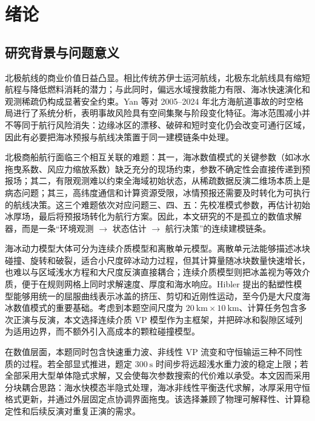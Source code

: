 \documentclass[UTF8,fontset=none]{ctexart}
\begin{document}
\pagestyle{plain}
\newpage
\linespread{1.25}\selectfont
\tableofcontents
\newpage

\section{绪论}

\subsection{研究背景与问题意义}

北极航线的商业价值日益凸显。相比传统苏伊士运河航线，北极东北航线具有缩短航程与降低燃料消耗的潜力；与此同时，偏远水域搜救能力有限、海冰快速演化和观测稀疏仍构成显著安全约束。Yan 等\cite{yan2026}对 2005--2024 年北方海航道事故的时空格局进行了系统分析，表明事故风险具有空间集聚与阶段变化特征。海冰范围减小并不等同于航行风险消失：边缘冰区的漂移、破碎和短时变化仍会改变可通行区域，因此有必要把海冰预报与航线决策置于同一建模链条中处理。

北极商船航行面临三个相互关联的难题：其一，海冰数值模式的关键参数（如冰水拖曳系数、风应力缩放系数）缺乏充分的现场约束，参数不确定性会直接传递到预报场；其二，有限观测难以约束全海域初始状态，从稀疏数据反演二维场本质上是病态问题；其三，高纬度通信和计算资源受限，冰情预报还需要及时转化为可执行的航线决策。这三个难题依次对应问题三、四、五：先校准模式参数，再估计初始冰厚场，最后将预报场转化为航行方案。因此，本文研究的不是孤立的数值求解器，而是一条“环境观测 $\to$ 状态估计 $\to$ 航行决策”的连续建模链条。

海冰动力模型大体可分为连续介质模型和离散单元模型。离散单元法能够描述冰块碰撞、旋转和破裂，适合小尺度碎冰动力过程，但其计算量随冰块数量快速增长，也难以与区域浅水方程和大尺度反演直接耦合；连续介质模型则把冰盖视为等效介质，便于在规则网格上同时求解速度、厚度和海水响应。Hibler 提出的黏塑性模型能够用统一的屈服曲线表示冰盖的挤压、剪切和近刚性运动，至今仍是大尺度海冰数值模式的重要基础\cite{hibler1979,feltham2008}。考虑到本题空间尺度为 $20\ \mathrm{km}\times10\ \mathrm{km}$、计算任务包含多次正演与反演，本文选择连续介质 VP 模型作为主框架，并把碎冰和裂隙区域列为适用边界，而不额外引入高成本的颗粒碰撞模型。

在数值层面，本题同时包含快速重力波、非线性 VP 流变和守恒输运三种不同性质的过程。若全部显式推进，题定 $300\ \mathrm s$ 时间步将远超浅水重力波的稳定上限；若全部采用大型单体隐式求解，又会使每次参数搜索的代价难以承受。本文因而采用分块耦合思路：海水快模态半隐式处理，海冰非线性平衡迭代求解，冰厚采用守恒格式更新，并通过外层固定点协调界面拖曳。该选择兼顾了物理可解释性、计算稳定性和后续反演对重复正演的需求。
\end{document}

